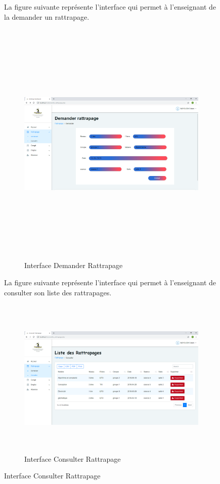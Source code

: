 \documentclass[12 pt]{report}
\begin{document}
\begin{figure}[h]
\begin{center}
La figure suivante représente l'interface qui permet à l'enseignant de la demander un rattrapage.

\begin{figure}[h]
 \begin{center}
\includegraphics[width= 18 cm ,height=  12cm]{demander_rattrapage.PNG}
\caption{Interface Demander Rattrapage}

\end{center}
\end{figure}
\newpage
La figure suivante représente l'interface qui permet à l'enseignant de consulter son liste des  rattrapages.

\begin{figure}[h]
 \begin{center}
\includegraphics[width= 15 cm ,height=  7.7cm]{consulter_rattrapage.PNG}
\caption{Interface Consulter Rattrapage}


\end{center}
\end{figure}
\end{center}
\end{figure}
\end{document}
